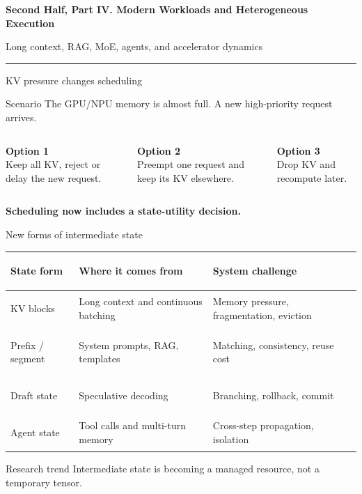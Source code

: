 \documentclass[aspectratio=169,11pt]{beamer}
\newcommand{\key}[1]{\textcolor{HUSTDeep}{\textbf{#1}}}
\newcommand{\topicsectionpage}[2]{%
  \begin{frame}[plain]
    \vspace{1.0cm}
    {\huge\bfseries\textcolor{HUSTBlue}{#1}}\par
    \vspace{0.26cm}
    {\large\textcolor{HUSTGray}{#2}}\par
    \vfill
    \textcolor{HUSTLine}{\rule{0.76\paperwidth}{0.8pt}}
  \end{frame}
}
\begin{document}
\topicsectionpage{Second Half, Part IV. Modern Workloads and Heterogeneous Execution}{Long context, RAG, MoE, agents, and accelerator dynamics}

\begin{frame}{KV pressure changes scheduling}
  \begin{block}{Scenario}
    The GPU/NPU memory is almost full. A new high-priority request arrives.
  \end{block}
  \begin{columns}[T,totalwidth=\textwidth]
    \begin{column}{0.34\textwidth}
      \textbf{\textcolor{HUSTBlue}{Option 1}}\\
      Keep all KV, reject or delay the new request.
    \end{column}
    \begin{column}{0.34\textwidth}
      \textbf{\textcolor{HUSTBlue}{Option 2}}\\
      Preempt one request and keep its KV elsewhere.
    \end{column}
    \begin{column}{0.30\textwidth}
      \textbf{\textcolor{HUSTBlue}{Option 3}}\\
      Drop KV and recompute later.
    \end{column}
  \end{columns}
  \vspace{0.35cm}
  \key{Scheduling now includes a state-utility decision.}
\end{frame}

\iffalse %
\begin{frame}{New forms of intermediate state}
  \small
  \begin{tabularx}{\textwidth}{>{\bfseries\raggedright\arraybackslash}p{2.5cm}YY}
    \toprule
    State form & Where it comes from & System challenge \\
    \midrule
    KV blocks & Long context and continuous batching & Memory pressure, fragmentation, eviction \\
    Prefix / segment & System prompts, RAG, templates & Matching, consistency, reuse cost \\
    Draft state & Speculative decoding & Branching, rollback, commit \\
    Agent state & Tool calls and multi-turn memory & Cross-step propagation, isolation \\
    \bottomrule
  \end{tabularx}
  \vspace{0.28cm}
  \begin{block}{Research trend}
    Intermediate state is becoming a managed resource, not a temporary tensor.
  \end{block}
\end{frame}
\end{document}
